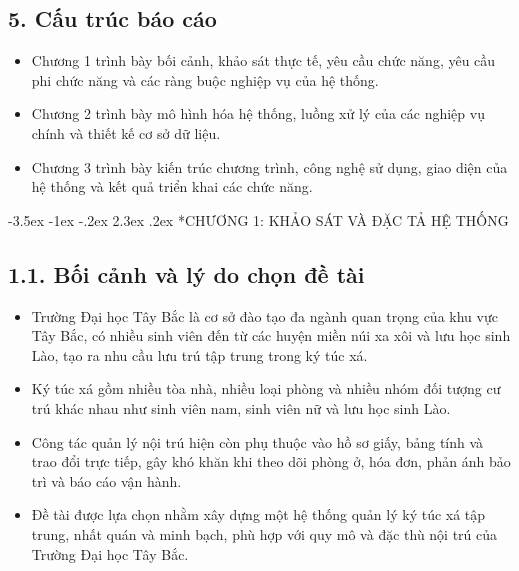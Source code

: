 \documentclass[13pt,a4paper]{extarticle}
\makeatletter
\renewcommand\section{\@startsection {section}{1}{\z@}%
	{-3.5ex \@plus -1ex \@minus -.2ex}%
	{2.3ex \@plus .2ex}%
	{\centering\normalfont\Large\bfseries}}
\makeatother
\begin{document}
	\subsection*{5. Cấu trúc báo cáo}
	\begin{itemize}
		\item Chương 1 trình bày bối cảnh, khảo sát thực tế, yêu cầu chức năng, yêu cầu phi chức năng và các ràng buộc nghiệp vụ của hệ thống.
		\item Chương 2 trình bày mô hình hóa hệ thống, luồng xử lý của các nghiệp vụ chính và thiết kế cơ sở dữ liệu.
		\item Chương 3 trình bày kiến trúc chương trình, công nghệ sử dụng, giao diện của hệ thống và kết quả triển khai các chức năng.
	\end{itemize}
	
	\section*{CHƯƠNG 1: KHẢO SÁT VÀ ĐẶC TẢ HỆ THỐNG}
	
	\subsection*{1.1. Bối cảnh và lý do chọn đề tài}
	\begin{itemize}
		\item Trường Đại học Tây Bắc là cơ sở đào tạo đa ngành quan trọng của khu vực Tây Bắc, có nhiều sinh viên đến từ các huyện miền núi xa xôi và lưu học sinh Lào, tạo ra nhu cầu lưu trú tập trung trong ký túc xá.
		\item Ký túc xá gồm nhiều tòa nhà, nhiều loại phòng và nhiều nhóm đối tượng cư trú khác nhau như sinh viên nam, sinh viên nữ và lưu học sinh Lào.
		\item Công tác quản lý nội trú hiện còn phụ thuộc vào hồ sơ giấy, bảng tính và trao đổi trực tiếp, gây khó khăn khi theo dõi phòng ở, hóa đơn, phản ánh bảo trì và báo cáo vận hành.
		\item Đề tài được lựa chọn nhằm xây dựng một hệ thống quản lý ký túc xá tập trung, nhất quán và minh bạch, phù hợp với quy mô và đặc thù nội trú của Trường Đại học Tây Bắc.
	\end{itemize}
	
\end{document}
